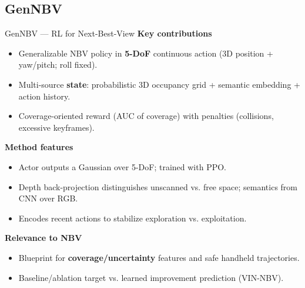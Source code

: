 \documentclass[10pt,aspectratio=169]{beamer}
\begin{document}
\subsection{GenNBV}
\begin{frame}{GenNBV --- RL for Next-Best-View}
\textbf{Key contributions}~\cite{GenNBV-chen2024}
\begin{itemize}
  \item Generalizable NBV policy in \textbf{5-DoF} continuous action (3D position + yaw/pitch; roll fixed).
  \item Multi-source \textbf{state}: probabilistic 3D occupancy grid + semantic embedding + action history.
  \item Coverage-oriented reward (AUC of coverage) with penalties (collisions, excessive keyframes).
\end{itemize}
\textbf{Method features}
\begin{itemize}
  \item Actor outputs a Gaussian over 5-DoF; trained with PPO.
  \item Depth back-projection distinguishes unscanned vs. free space; semantics from CNN over RGB.
  \item Encodes recent actions to stabilize exploration vs. exploitation.
\end{itemize}
\textbf{Relevance to NBV}
\begin{itemize}
  \item Blueprint for \textbf{coverage/uncertainty} features and safe handheld trajectories.
  \item Baseline/ablation target vs. learned improvement prediction (VIN-NBV).
\end{itemize}
\end{frame}

\end{document}
